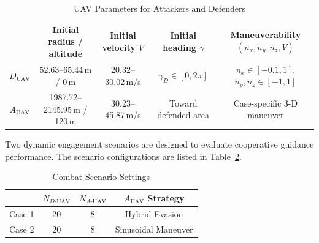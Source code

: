 \documentclass[lettersize,journal]{IEEEtran}
\providecommand{\DIFadd}[1]{{\protect\color{blue} #1}} %
\providecommand{\DIFdel}[1]{} %
\providecommand{\DIFaddFL}[1]{\DIFadd{#1}} %
\providecommand{\DIFdelFL}[1]{\DIFdel{#1}} %
\providecommand{\DIFaddbeginFL}{} %
\providecommand{\DIFaddendFL}{} %
\providecommand{\DIFdelbeginFL}{} %
\providecommand{\DIFdelendFL}{} %
\begin{document}
\begin{table}[!t]
\centering
\caption{UAV Parameters for Attackers and Defenders}
\label{chushicanshu}
\renewcommand{\arraystretch}{1.6}
\begin{tabular}{ccccc}
\hline\hline
 & Initial \DIFdelbeginFL \DIFdelFL{position $(x,y)$ }\DIFdelendFL \DIFaddbeginFL \DIFaddFL{radius / altitude }\DIFaddendFL & Initial velocity $V$ & Initial heading $\gamma$ & Maneuverability \DIFdelbeginFL \DIFdelFL{$(n_x,n_y,V)$ }\DIFdelendFL \DIFaddbeginFL \DIFaddFL{$(n_x,n_y,n_z,V)$ }\DIFaddendFL \\ \hline
$D_{\text{UAV}}$ & \DIFdelbeginFL \DIFdelFL{$r\sim U[0,D_3]$, $\theta\sim U[0,2\pi]$ }\DIFdelendFL \DIFaddbeginFL \DIFaddFL{52.63--65.44\,m / 0\,m }\DIFaddendFL & \DIFdelbeginFL \DIFdelFL{$V_D\sim U[10,40]$}\DIFdelendFL \DIFaddbeginFL \DIFaddFL{20.32--30.02}\DIFaddendFL \,m/s & \DIFdelbeginFL \DIFdelFL{$\gamma_D\sim U[0,2\pi]$ }\DIFdelendFL \DIFaddbeginFL \DIFaddFL{$\gamma_D\in[0,2\pi]$ }\DIFaddendFL & \DIFdelbeginFL \DIFdelFL{$n_x\in[-0.1g,1g]$, $n_y\in[-1g,1g]$ }\DIFdelendFL \DIFaddbeginFL \DIFaddFL{$n_x\in[-0.1,1]$, $n_y,n_z\in[-1,1]$ }\DIFaddendFL \\
$A_{\text{UAV}}$ & \DIFdelbeginFL \DIFdelFL{$r\sim U[D_1,D_2]$, $\theta\sim U[0,2\pi]$ }\DIFdelendFL \DIFaddbeginFL \DIFaddFL{1987.72--2145.95\,m / 120\,m }\DIFaddendFL & \DIFdelbeginFL \DIFdelFL{$V_A\sim U[10,40]$}\DIFdelendFL \DIFaddbeginFL \DIFaddFL{30.23--45.87}\DIFaddendFL \,m/s & \DIFdelbeginFL \DIFdelFL{$\gamma_A\sim U[q_A-30^\circ,q_A+30^\circ]$ }\DIFdelendFL \DIFaddbeginFL \DIFaddFL{Toward defended area }\DIFaddendFL & \DIFdelbeginFL \DIFdelFL{$n_x=0$, $n_y\in[-1g,1g]$ }\DIFdelendFL \DIFaddbeginFL \DIFaddFL{Case-specific 3-D maneuver }\DIFaddendFL \\ \hline
\end{tabular}
\end{table}

Two dynamic engagement scenarios are designed to evaluate cooperative guidance performance.
The scenario configurations are listed in Table~\ref{changjingqingkuang}.

\begin{table}[!t]
\centering
\renewcommand{\arraystretch}{1.4}
\caption{Combat Scenario Settings}
\label{changjingqingkuang}
\begin{tabular}{cccc}
\hline\hline
 & $N_{D\text{-UAV}}$ & $N_{A\text{-UAV}}$ & $A_{\text{UAV}}$ Strategy \\ \hline
Case 1 & 20 & 8 & Hybrid Evasion \\
Case 2 & 20 & 8 & Sinusoidal Maneuver \\ \hline
\end{tabular}
\end{table}
\end{document}
